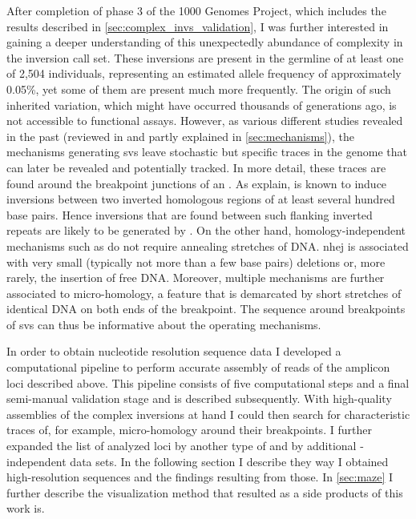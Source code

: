 After completion of phase 3 of the 1000 Genomes Project, which includes the
results described in \cref{sec:complex_invs_validation}, I was further
interested in gaining a deeper understanding of this unexpectedly abundance of
complexity in the inversion call set. These inversions are present in the
germline of at least one of 2,504 individuals, representing an estimated allele
frequency of approximately 0.05\%, yet some of them are present much more
frequently. The origin of such inherited variation, which might have occurred
thousands of generations ago, is not accessible to functional assays. However,
as various different studies revealed in the past (reviewed in
\cite{Onishi-Seebacher2011,Hastings2009} and partly explained in
\cref{sec:mechanisms}), the mechanisms generating \acp{sv} leave stochastic but
specific traces in the genome that can later be revealed and potentially
tracked. In more detail, these traces are found around the breakpoint junctions
of an \sv. As \cite{Hastings2009} explain, \nahr is known to induce inversions
between two inverted homologous regions of at least several hundred base pairs.
Hence inversions that are found between such flanking inverted repeats are
likely to be generated by \nahr. On the other hand, homology-independent
mechanisms such as \nhej do not require annealing stretches of DNA. \acs{nhej}
is associated with very small (typically not more than a few base pairs)
deletions or, more rarely, the insertion of free DNA. Moreover, multiple
mechanisms are further associated to micro-homology, a feature that is
demarcated by short stretches of identical DNA on both ends of the breakpoint.
The sequence around breakpoints of \acp{sv} can thus be informative about the
operating mechanisms.

In order to obtain nucleotide resolution sequence data I developed a
computational pipeline to perform accurate assembly of \pacbio reads of the
amplicon loci described above. This pipeline consists of five computational
steps and a final semi-manual validation stage and is described subsequently.
With high-quality assemblies of the complex inversions at hand I could then
search for characteristic traces of, for example, micro-homology around their
breakpoints. I further expanded the list of analyzed loci by another type of \sv
and by additional \pacbio-independent data sets. In the following section I
describe they way I obtained high-resolution sequences and the findings
resulting from those. In \cref{sec:maze} I further describe the visualization
method that resulted as a side products of this work is.




